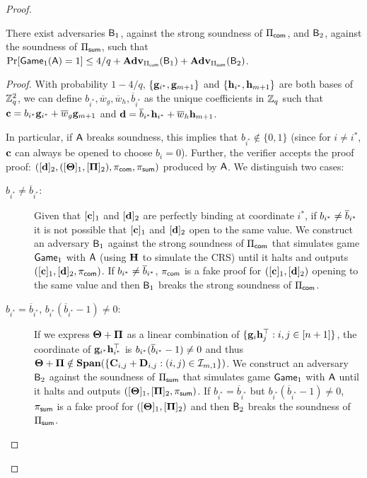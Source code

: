 \begin{proof}
\begin{description}
\begin{lemma}
There exist adversaries $\mathsf{B}_1$, against the strong soundness of $\Pi_{\mathsf{com}}$, and $\mathsf{B}_2$, against the soundness of $\Pi_{\mathsf{sum}}$, such that $\Pr[\mathsf{Game}_1(\mathsf{A})=1]\leq 4/q+ \mathbf{Adv}_{\Pi_{\mathsf{com}}}(\mathsf{B}_1)+\mathbf{Adv}_{\Pi_{\mathsf{sum}}}(\mathsf{B}_2)$.
\end{lemma}
\begin{proof}
With probability $1-4/q$, $\{\mathbf{g}_{i^*},\mathbf{g}_{m+1}\}$ and $\{\mathbf{h}_{i^*},\mathbf{h}_{m+1}\}$ are both bases of $\mathbb{Z}_q^2$,
we can define $b_{i^*},\overline{w}_g,\overline{w}_h,\overline{b}_{i^*}$ as the unique coefficients in $\mathbb{Z}_q$ such that $\mathbf{c}=b_{i^*}\mathbf{g}_{i^*} + \overline{w}_g \mathbf{g}_{m+1}$ and $\mathbf{d}= \overline{b}_{i^*} \mathbf{h}_{i^*} + \overline{w}_h \mathbf{h}_{m+1}$.

In particular, if $\mathsf{A}$ breaks soundness, this implies that $b_{i^*} \notin \{0,1\}$ (since for $i\neq i^*$, 
$\mathbf{c}$ can always be opened to 
  choose $b_i=0$). Further, the verifier accepts the proof proof:
$ (
        [\mathbf{d}]_2,
        ([\mathbf{{\Theta}}]_1, [\mathbf{{\Pi}}]_2), 
        \pi_{\mathsf{com}},\pi_{\mathsf{sum}} )$
  produced by $\mathsf{A}$.
We distinguish two cases:
\begin{description}
\item[$b_{i^*} \neq \overline{b}_{i^*}$:] Given that $[\mathbf{c}]_1$ and $[\mathbf{d}]_2$ are perfectly binding at coordinate $i^*$, if $b_{i^*}\neq\overline{b}_{i^*}$ it is not possible that $[\mathbf{c}]_1$ and $[\mathbf{d}]_2$ open to the same value. We construct an adversary $\mathsf{B}_1$ against the strong soundness 
of $\Pi_{\mathsf{com}}$ that simulates game $\mathsf{Game}_1$ with $\mathsf{A}$ (using $\mathbf{{H}}$ to simulate the CRS) until it halts and outputs $([\mathbf{c}]_1,[\mathbf{d}]_2,\pi_{\mathsf{com}})$. If $b_{i^*}\neq\overline{b}_{i^*}$, $\pi_{\mathsf{com}}$ is a fake proof for $([\mathbf{c}]_1,[\mathbf{d}]_2)$ opening to the same value and then $\mathsf{B}_1$ breaks the strong soundness of $\Pi_{\mathsf{com}}$.
\item[$b_{i^*} = \overline{b}_{i^*}$, 
$b_{i^*}(\overline{b}_{i^*} -1) \neq 0$:]
If we express $\mathbf{{\Theta}}+\mathbf{{\Pi}}$
as a linear combination of $\{\mathbf{g}_{i}\mathbf{h}_{j}^{\top}:i,j\in[n+1]\}$, the coordinate of
$\mathbf{g}_{i^*}\mathbf{h}_{i^*}^\top$ is $b_{i^*}(\overline{b}_{i^*}-1)\neq 0$ and thus $\mathbf{{\Theta}}+\mathbf{{\Pi}}\notin\mathbf{Span}(\{\mathbf{{C}}_{i,j}+\mathbf{{D}}_{i,j}:(i,j)\in\mathcal{I}_{m,1}\})$. We construct an adversary $\mathsf{B}_2$ against the soundness of $\Pi_{\mathsf{sum}}$ that simulates game $\mathsf{Game}_1$ with $\mathsf{A}$ until it halts and outputs $([\mathbf{{\Theta}}]_1,[\mathbf{{\Pi}}]_2,\pi_{\mathsf{sum}})$. If $b_{i^*} = \overline{b}_{i^*}$ but $b_{i^*}(\overline{b}_{i^*} -1) \neq 0$, $\pi_{\mathsf{sum}}$ is a fake proof for $([\mathbf{{\Theta}}]_1,[\mathbf{{\Pi}}]_2)$ and then $\mathsf{B}_2$ breaks the soundness of $\Pi_{\mathsf{sum}}$.
\end{description}
\end{proof}


\end{description}
\end{proof}
